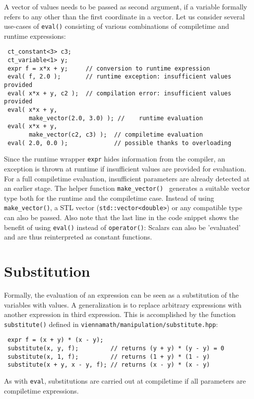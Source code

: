A vector of values needs to be passed as second argument, if a variable formally refers to any other than the first coordinate in a vector.
Let us consider several use-cases of \lstinline|eval()| consisting of various combinations of compiletime and runtime expressions:
\begin{lstlisting}
 ct_constant<3> c3;
 ct_variable<1> y;
 expr f = x*x + y;     // conversion to runtime expression
 eval( f, 2.0 );       // runtime exception: insufficient values provided
 eval( x*x + y, c2 );  // compilation error: insufficient values provided
 eval( x*x + y,
       make_vector(2.0, 3.0) ); //    runtime evaluation
 eval( x*x + y,
       make_vector(c2, c3) );  // compiletime evaluation
 eval( 2.0, 0.0 );             // possible thanks to overloading
\end{lstlisting}
Since the runtime wrapper \lstinline|expr| hides information from the compiler, an exception is thrown at runtime if insufficient values are provided for evaluation.
For a full compiletime evaluation, insufficient parameters are already detected at an earlier stage.
The helper function \lstinline|make_vector() | generates a suitable vector type both for the runtime and the compiletime case.
Instead of using \lstinline|make_vector()|, a STL vector (\lstinline|std::vector<double>|) or any compatible type can also be passed.
Also note that the last line in the code snippet shows the benefit of using \lstinline|eval()| instead of \lstinline|operator()|:
Scalars can also be 'evaluated' and are thus reinterpreted as constant functions.

 \section{Substitution} \label{sec:substitute}
Formally, the evaluation of an expression can be seen as a substitution of the variables with values.
A generalization is to replace arbitrary expressions with another expression in third expression.
This is accomplished by the function \lstinline|substitute()| defined in \lstinline|viennamath/manipulation/substitute.hpp|:
\begin{lstlisting}
 expr f = (x + y) * (x - y);
 substitute(x, y, f);         // returns (y + y) * (y - y) = 0
 substitute(x, 1, f);         // returns (1 + y) * (1 - y)
 substitute(x + y, x - y, f); // returns (x - y) * (x - y)
\end{lstlisting}
As with \lstinline|eval|, substitutions are carried out at compiletime if all parameters are compiletime expressions.


